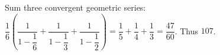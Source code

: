 Sum three convergent geometric series: $\dfrac{1}{6}\left(\dfrac{1}{1-\dfrac{1}{6}}+\dfrac{1}{1-\dfrac{1}{3}}+\dfrac{1}{1-\dfrac{1}{2}}\right)=\dfrac{1}{5}+\dfrac{1}{4}+\dfrac{1}{3}=\dfrac{47}{60}$. Thus $\boxed{107}$.
